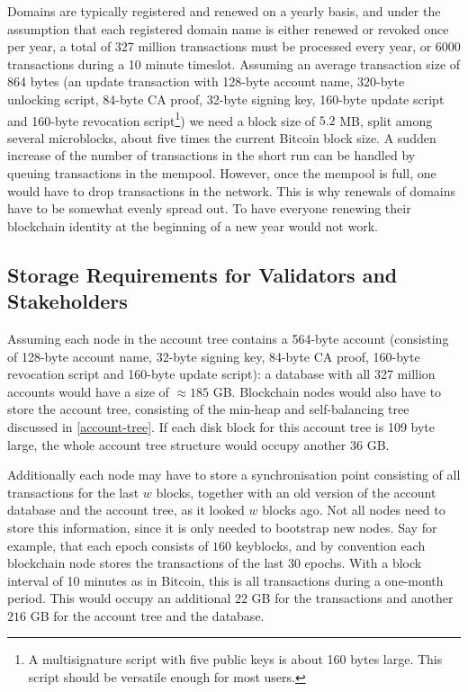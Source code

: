 \documentclass{style/kththesis}
\begin{document}


Domains are typically registered and renewed on a yearly basis, and under the assumption that each registered domain name is either renewed or revoked once per year, a total of 327 million transactions must be processed every year, or 6000 transactions during a 10 minute timeslot. Assuming an average transaction size of 864 bytes (an update transaction with 128-byte account name, 320-byte unlocking script, 84-byte CA proof, 32-byte signing key, 160-byte update script and 160-byte revocation script\footnote{A multisignature script with five public keys is about 160 bytes large. This script should be versatile enough for most users.}) we need a block size of $5.2$ MB, split among several microblocks, about five times the current Bitcoin block size. A sudden increase of the number of transactions in the short run can be handled by queuing transactions in the mempool. However, once the mempool is full, one would have to drop transactions in the network. This is why renewals of domains have to be somewhat evenly spread out. To have everyone renewing their blockchain identity at the beginning of a new year would not work.

\subsection{Storage Requirements for Validators and Stakeholders}
Assuming each node in the account tree contains a 564-byte account (consisting of 128-byte account name, 32-byte signing key, 84-byte CA proof, 160-byte revocation script and 160-byte update script): a database with all 327 million accounts would have a size of $\approx 185$ GB. Blockchain nodes would also have to store the account tree, consisting of the min-heap and self-balancing tree discussed in \cref{account-tree}. If each disk block for this account tree is 109 byte large, the whole account tree structure would occupy another $36$ GB. 

Additionally each node may have to store a synchronisation point consisting of all transactions for the last $w$ blocks, together with an old version of the account database and the account tree, as it looked $w$ blocks ago. Not all nodes need to store this information, since it is only needed to bootstrap new nodes. Say for example, that each epoch consists of $160$ keyblocks, and by convention each blockchain node stores the transactions of the last 30 epochs. With a block interval of 10 minutes as in Bitcoin, this is all transactions during a one-month period. This would occupy an additional $22$ GB for the transactions and another $216$ GB for the account tree and the database. 
\end{document}
